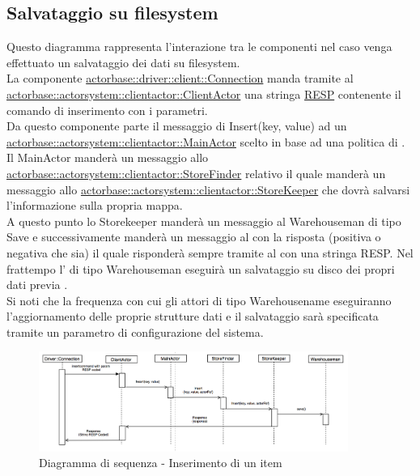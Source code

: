\documentclass{scalatekids-article}
\begin{document}
\subsection{Salvataggio su filesystem}

Questo diagramma rappresenta l'interazione tra le componenti nel caso venga
effettuato un salvataggio dei dati su filesystem.\\
La componente \hyperref[sec:actorbase::driver::client::Connection]{actorbase::driver::client::Connection}
manda tramite  al \hyperref[sec:actorbase::actorsystem::clientactor::ClientActor]{actorbase::actorsystem::clientactor::ClientActor}
una stringa \hyperref[sec:RESP]{RESP} contenente il comando di inserimento  con
i parametri.\\
Da questo componente parte il messaggio di Insert(key, value) ad un \hyperref[sec:actorbase::actorsystem::clientactor::MainActor]{actorbase::actorsystem::clientactor::MainActor} scelto in base ad una
politica di . Il MainActor manderà un messaggio allo \hyperref[sec:actorbase::actorsystem::clientactor::StoreFinder]{actorbase::actorsystem::clientactor::StoreFinder} relativo il quale manderà un messaggio allo \hyperref[sec:actorbase::actorsystem::clientactor::StoreKeeper]{actorbase::actorsystem::clientactor::StoreKeeper} che dovrà salvarsi l'informazione
sulla propria mappa.\\
A questo punto lo Storekeeper manderà un messaggio al Warehouseman di tipo Save e
successivamente manderà un messaggio al  con la risposta
(positiva o negativa che sia) il quale risponderà sempre tramite  al  con una stringa RESP.
Nel frattempo l' di tipo Warehouseman eseguirà un salvataggio su disco dei propri dati previa .\\
Si noti che la frequenza con cui gli attori di tipo Warehousename eseguiranno
l'aggiornamento delle proprie strutture dati e il salvataggio sarà specificata
tramite un parametro di configurazione del sistema.\\
\begin{figure}[H]
  \begin{center}
    \includegraphics[width=0.9\textwidth, keepaspectratio]{img/diagrammiSequenza/esempioSave.png}
    \caption{Diagramma di sequenza - Inserimento di un item}
  \end{center}
\end{figure}
\end{document}
